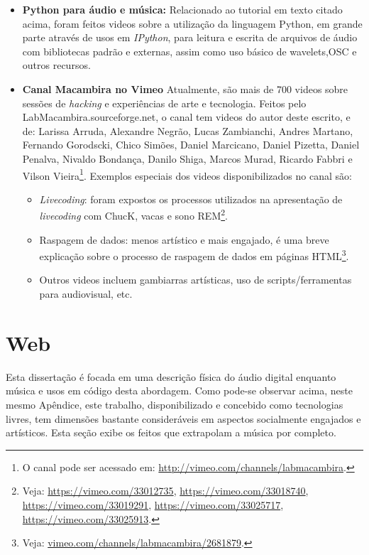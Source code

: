 \begin{itemize}
    \item {\bf Python para áudio e música:}
    Relacionado ao tutorial em texto citado acima, foram feitos videos sobre a utilização da linguagem Python,
    em grande parte através de usos em \emph{IPython}, para leitura e escrita de arquivos de áudio com bibliotecas
    padrão e externas, assim como uso básico de wavelets,OSC e outros recursos.

    \item {\bf Canal Macambira no Vimeo}
    Atualmente, são mais de 700 videos sobre sessões de \emph{hacking} e experiências de arte
    e tecnologia. Feitos pelo LabMacambira.sourceforge.net, o canal tem videos do autor
    deste escrito, e de: Larissa Arruda, Alexandre Negrão, Lucas Zambianchi, Andres Martano,
    Fernando Gorodscki, Chico Simões, Daniel Marcicano, Daniel Pizetta, Daniel Penalva, Nivaldo Bondança,
    Danilo Shiga, Marcos Murad, Ricardo Fabbri e Vilson Vieira\footnote{O canal pode ser acessado em:
    \url{http://vimeo.com/channels/labmacambira}.}. Exemplos especiais dos videos disponibilizados no canal são:
    \begin{itemize}
	    \item \emph{Livecoding}: foram expostos os processos utilizados
        na apresentação de \emph{livecoding} com ChucK, vacas e sono REM\footnote{Veja: \url{https://vimeo.com/33012735},
        \url{https://vimeo.com/33018740}, \url{https://vimeo.com/33019291}, \url{https://vimeo.com/33025717},
        \url{https://vimeo.com/33025913}.}.

	    \item Raspagem de dados: menos artístico e mais engajado, é uma breve explicação
        sobre o processo de raspagem de dados em páginas HTML\footnote{Veja: \url{vimeo.com/channels/labmacambira/2681879}.}.

        \item Outros videos incluem gambiarras artísticas, uso de scripts/ferramentas para audiovisual, etc.
    \end{itemize}
\end{itemize}





\section{Web}
Esta dissertação é focada em uma descrição física do áudio digital enquanto música e
usos em código desta abordagem. Como pode-se observar acima, neste mesmo Apêndice, este trabalho, disponibilizado e concebido como tecnologias livres, tem dimensões bastante consideráveis em aspectos socialmente engajados e artísticos. Esta seção exibe os feitos que extrapolam a música por completo.

